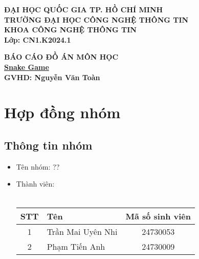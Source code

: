 \documentclass[a4paper, 12pt]{article}
\title{}
\author{}
\date{}
\begin{document}
\maketitle

\begin{center}
    \large \textbf{ĐẠI HỌC QUỐC GIA TP. HỒ CHÍ MINH}\\
    \large \textbf{TRƯỜNG ĐẠI HỌC CÔNG NGHỆ THÔNG TIN}\\
    \large \textbf{KHOA CÔNG NGHỆ THÔNG TIN}\\[2cm]
    
    \textbf{Lớp: CN1.K2024.1}\\
    \vspace{0.5cm}
    
    \vspace{2cm}
    \Large \textbf{BÁO CÁO ĐỒ ÁN MÔN HỌC}\\[0.5cm]
    \Large \textbf{\underline{Snake Game}}\\[0.5cm]
    \Large \textbf{GVHD: Nguyễn Văn Toàn}\\[0.5cm]
    \vspace{2cm}

    \vspace{1cm}
\end{center}

\newpage
\tableofcontents
\newpage

\section{Hợp đồng nhóm}
\subsection{Thông tin nhóm}
\begin{itemize}
    \item Tên nhóm: ??
    \item Thành viên:\\\\
        \begin{tabular}{|c|l|c|}
            \hline
            \textbf{STT} & \textbf{Tên} & \textbf{Mã số sinh viên} \\
            \hline
            1 & Trần Mai Uyên Nhi & 24730053 \\
            \hline
            2 & Phạm Tiến Anh & 24730009 \\
            \hline
        \end{tabular}
\end{itemize}
\end{document}
